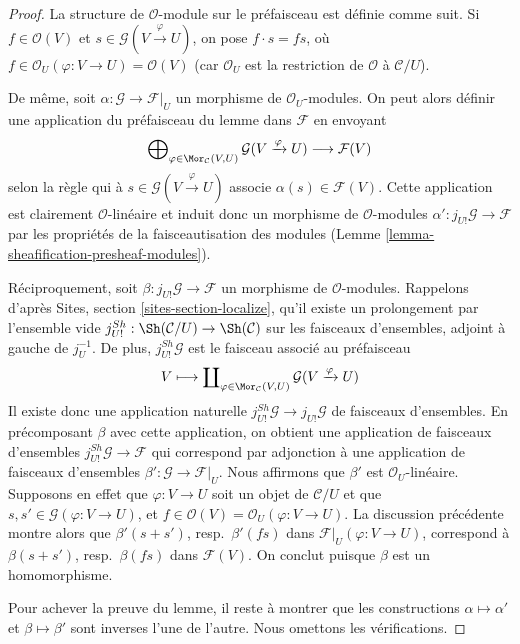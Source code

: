 \begin{proof}
La structure de $\mathcal{O}$-module sur le préfaisceau est définie
comme suit. Si $f \in \mathcal{O}(V)$ et
$s \in \mathcal{G}(V \xrightarrow{\varphi} U)$, on pose
$f \cdot s = fs$, où
$f \in \mathcal{O}_U(\varphi : V \to U) = \mathcal{O}(V)$
(car $\mathcal{O}_U$ est la restriction de $\mathcal{O}$ à
$\mathcal{C}/U$).

\medskip\noindent
De même, soit $\alpha : \mathcal{G} \to \mathcal{F}|_U$ un
morphisme de $\mathcal{O}_U$-modules. On peut alors définir une
application du préfaisceau du lemme dans $\mathcal{F}$ en envoyant
$$
\bigoplus\nolimits_{\varphi \in \Mor_\mathcal{C}(V, U)}
\mathcal{G}(V \xrightarrow{\varphi} U)
\longrightarrow
\mathcal{F}(V)
$$
selon la règle qui à $s \in \mathcal{G}(V \xrightarrow{\varphi} U)$
associe $\alpha(s) \in \mathcal{F}(V)$. Cette application est clairement
$\mathcal{O}$-linéaire et induit donc un morphisme de
$\mathcal{O}$-modules $\alpha' : j_{U!}\mathcal{G} \to \mathcal{F}$
par les propriétés de la faisceautisation des modules
(Lemme \ref{lemma-sheafification-presheaf-modules}).

\medskip\noindent
Réciproquement, soit $\beta : j_{U!}\mathcal{G} \to \mathcal{F}$
un morphisme de $\mathcal{O}$-modules.
Rappelons d'après Sites, section \ref{sites-section-localize},
qu'il existe un prolongement par l'ensemble vide
$j^{Sh}_{U!} : \Sh(\mathcal{C}/U) \to \Sh(\mathcal{C})$
sur les faisceaux d'ensembles, adjoint à gauche de $j_U^{-1}$.
De plus, $j^{Sh}_{U!}\mathcal{G}$ est le faisceau associé au préfaisceau
$$
V
\longmapsto
\coprod\nolimits_{\varphi \in \Mor_\mathcal{C}(V, U)}
\mathcal{G}(V \xrightarrow{\varphi} U)
$$
Il existe donc une application naturelle
$j^{Sh}_{U!}\mathcal{G} \to j_{U!}\mathcal{G}$ de faisceaux d'ensembles.
En précomposant $\beta$ avec cette application, on obtient une
application de faisceaux d'ensembles
$j^{Sh}_{U!}\mathcal{G} \to \mathcal{F}$ qui correspond par adjonction
à une application de faisceaux d'ensembles
$\beta' : \mathcal{G} \to \mathcal{F}|_U$.
Nous affirmons que $\beta'$ est $\mathcal{O}_U$-linéaire. Supposons en effet
que $\varphi : V \to U$ soit un objet de $\mathcal{C}/U$ et que
$s, s' \in \mathcal{G}(\varphi : V \to U)$, et
$f \in \mathcal{O}(V) = \mathcal{O}_U(\varphi : V \to U)$.
La discussion précédente montre alors que
$\beta'(s + s')$, resp.\ $\beta'(fs)$ dans
$\mathcal{F}|_U(\varphi : V \to U)$, correspond à
$\beta(s + s')$, resp.\ $\beta(fs)$ dans
$\mathcal{F}(V)$. On conclut puisque $\beta$ est un homomorphisme.

\medskip\noindent
Pour achever la preuve du lemme, il reste à montrer que les constructions
$\alpha \mapsto \alpha'$ et $\beta \mapsto \beta'$ sont inverses l'une de
l'autre. Nous omettons les vérifications.
\end{proof}

